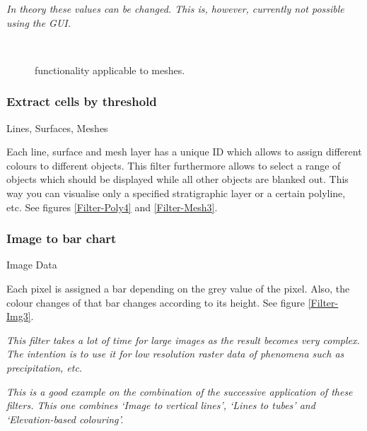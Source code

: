  \emph{In theory these values can be changed. This is, however, currently not possible using the GUI.}

\begin{figure}[tb]
\begin{center}
\enspace
{} \\
\enspace
{}
\end{center}
\caption{\ogs functionality applicable to meshes.} \label{fig:filter:mesh}
\end{figure}

\subsubsection{Extract cells by threshold}
 Lines, Surfaces, Meshes

 Each line, surface and mesh layer has a unique ID which allows to assign different colours to different objects. This filter furthermore allows to select a range of objects which should be displayed while all other objects are blanked out. This way you can visualise only a specified stratigraphic layer or a certain polyline, etc. See figures \ref{Filter-Poly4} and \ref{Filter-Mesh3}.

\subsubsection{Image to bar chart}
 Image Data

 Each pixel is assigned a bar depending on the grey value of the pixel. Also, the colour changes of that bar changes according to its height. See figure \ref{Filter-Img3}.

 \emph{This filter takes a lot of time for large images as the result becomes very complex. The intention is to use it for low resolution raster data of phenomena such as precipitation, etc.}

\emph{This is a good example on the combination of the successive application of these filters. This one combines `Image to vertical lines', `Lines to tubes' and `Elevation-based colouring'.}

